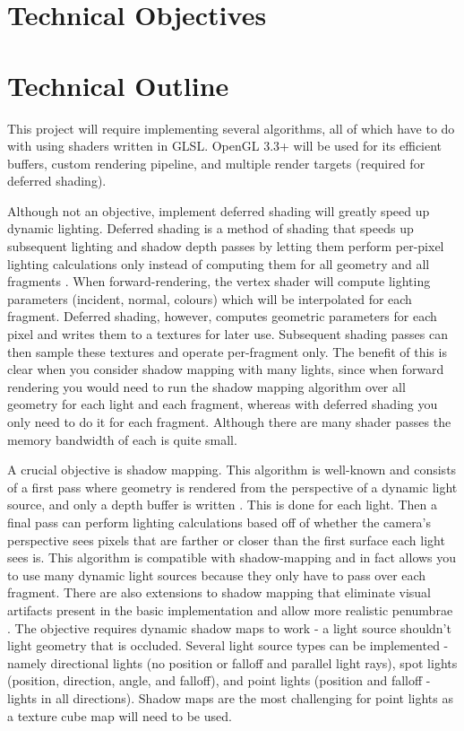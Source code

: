 \documentclass[oneside]{book}
\begin{document}
  \section{Technical Objectives}\label{technical-objectives}

  \label{ssao}

  \section{Technical Outline}
    This project will require implementing several algorithms, all of which have to do with using shaders written in GLSL.
    OpenGL 3.3+ will be used for its efficient buffers, custom rendering pipeline, and multiple render targets (required for deferred shading).

    Although not an objective, implement deferred shading will greatly speed up dynamic lighting. Deferred shading is a method of shading that speeds up subsequent lighting and shadow depth passes by letting them perform per-pixel lighting calculations only instead of computing them for all geometry and all fragments \cite{ferkoreal}.
    When forward-rendering, the vertex shader will compute lighting parameters (incident, normal, colours) which will be interpolated for each fragment. Deferred shading, however, computes geometric parameters for each pixel and writes them to a textures for later use. Subsequent shading passes can then sample these textures and operate per-fragment only. The benefit of this is clear when you consider shadow mapping with many lights, since when forward rendering you would need to run the shadow mapping algorithm over all geometry for each light and each fragment, whereas with deferred shading you only need to do it for each fragment. Although there are many shader passes the memory bandwidth of each is quite small.

    A crucial objective is shadow mapping. This algorithm is well-known and consists of a first pass where geometry is rendered from the perspective of a dynamic light source, and only a depth buffer is written \cite{williams1978casting}. This is done for each light. Then a final pass can perform lighting calculations based off of whether the camera's perspective sees pixels that are farther or closer than the first surface each light sees is. This algorithm is compatible with shadow-mapping and in fact allows you to use many dynamic light sources because they only have to pass over each fragment. There are also extensions to shadow mapping that eliminate visual artifacts present in the basic implementation and allow more realistic penumbrae \cite{dimitrov2007cascaded} \cite{fernando2005percentage}.
    The objective requires dynamic shadow maps to work - a light source shouldn't light geometry that is occluded. Several light source types can be implemented - namely directional lights (no position or falloff and parallel light rays), spot lights (position, direction, angle, and falloff), and point lights (position and falloff - lights in all directions). Shadow maps are the most challenging for point lights as a texture cube map will need to be used.
\end{document}
